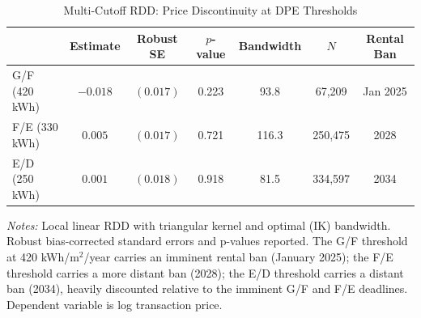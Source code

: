 \begin{table}[htbp]
\centering
\caption{Multi-Cutoff RDD: Price Discontinuity at DPE Thresholds}
\label{tab:rdd}
\begin{tabular}{lcccccc}
\toprule
 & Estimate & Robust SE & $p$-value & Bandwidth & $N$ & Rental Ban \\
\midrule
G/F (420 kWh) & $-0.018$ & $(0.017)$ & 0.223 & 93.8 & 67,209 & Jan 2025 \\
F/E (330 kWh) & $0.005$ & $(0.017)$ & 0.721 & 116.3 & 250,475 & 2028 \\
E/D (250 kWh) & $0.001$ & $(0.018)$ & 0.918 & 81.5 & 334,597 & 2034 \\
\bottomrule
\end{tabular}
\begin{tablenotes}
\small
\item \textit{Notes:} Local linear RDD with triangular kernel and optimal (IK) bandwidth. Robust bias-corrected standard errors and p-values reported. The G/F threshold at 420 kWh/m$^2$/year carries an imminent rental ban (January 2025); the F/E threshold carries a more distant ban (2028); the E/D threshold carries a distant ban (2034), heavily discounted relative to the imminent G/F and F/E deadlines. Dependent variable is log transaction price.
\end{tablenotes}
\end{table}
